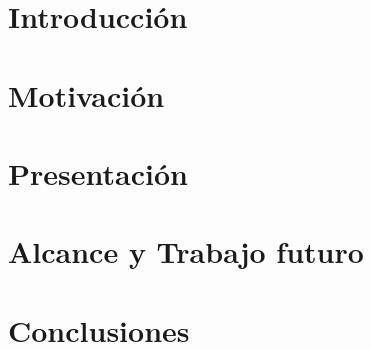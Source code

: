 \documentclass[12pt, a4paper, twoside]{article}
\begin{document}
{}



\clearpage{\pagestyle{empty}\clearpage}
\setcounter{page}{1}


\begin{TP}




\section{Introducción}

\section{Motivación}

\section{Presentación}

\section{Alcance y Trabajo futuro}

\section{Conclusiones}


\printbibliography


\end{TP}
\end{document}

